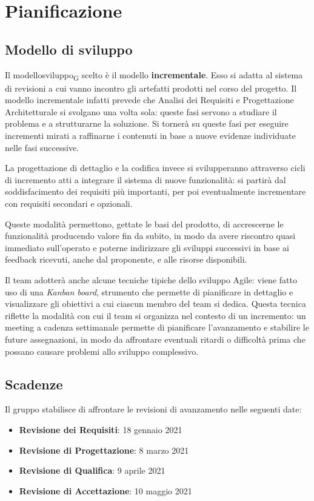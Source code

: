 \section{Pianificazione}

\subsection{Modello di sviluppo}

Il \gls{modellosviluppo}\textsubscript{G} scelto è il modello \textbf{incrementale}. Esso si adatta al sistema di revisioni a cui vanno incontro gli artefatti prodotti nel corso del progetto. Il modello incrementale infatti prevede che Analisi dei Requisiti e Progettazione Architetturale si svolgano una volta sola: queste fasi servono a studiare il problema e a strutturarne la soluzione. Si tornerà su queste fasi per eseguire incrementi mirati a raffinarne i contenuti in base a nuove evidenze individuate nelle fasi successive.

La progettazione di dettaglio e la codifica invece si svilupperanno attraverso cicli di incremento atti a integrare il sistema di nuove funzionalità: si partirà dal soddisfacimento dei requisiti più importanti, per poi eventualmente incrementare con requisiti secondari e opzionali. 

Queste modalità permettono, gettate le basi del prodotto, di accrescerne le funzionalità producendo valore fin da subito, in modo da avere riscontro quasi immediato sull'operato e poterne indirizzare gli sviluppi successivi in base ai feedback ricevuti, anche dal proponente, e alle risorse disponibili.

Il team adotterà anche alcune tecniche tipiche dello sviluppo Agile: viene fatto uso di una \textit{Kanban board}, strumento che permette di pianificare in dettaglio e visualizzare gli obiettivi a cui ciascun membro del team si dedica. Questa tecnica riflette la modalità con cui il team si organizza nel contesto di un incremento: un meeting a cadenza settimanale permette di pianificare l'avanzamento e stabilire le future assegnazioni, in modo da affrontare eventuali ritardi o difficoltà prima che possano causare problemi allo sviluppo complessivo.



\subsection{Scadenze}

Il gruppo stabilisce di affrontare le revisioni di avanzamento nelle seguenti date:
\begin{itemize}
	\item \textbf{Revisione dei Requisiti}: 18 gennaio 2021
	\item \textbf{Revisione di Progettazione}: 8 marzo 2021 
	\item \textbf{Revisione di Qualifica}: 9 aprile 2021
	\item \textbf{Revisione di Accettazione}: 10 maggio 2021	
\end{itemize}





